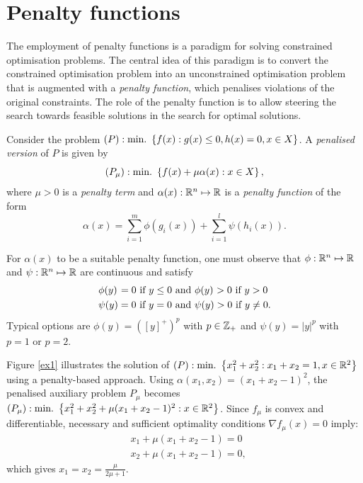 
\section{Penalty functions}

The employment of penalty functions is a paradigm for solving constrained optimisation problems. The central idea of this paradigm is to convert the constrained optimisation problem into an unconstrained optimisation problem that is augmented with a \emph{penalty function}, which penalises violations of the original constraints. The role of the penalty function is to allow steering the search towards feasible solutions in the search for optimal solutions. 

Consider the problem $(P): \mathop{\text{min.~}}\left\{ f(x) : g(x) \leq 0, h(x) = 0, x \in X \right \}$. A \emph{penalised version} of $P$ is given by 
$$
(P_\mu) : \mathop{\text{min.~}}\left\{ f(x) + \mu\alpha(x) : x \in X \right \},
$$
where $\mu > 0$ is a \emph{penalty term} and $\alpha(x) : \mathbb{R}^n \mapsto \mathbb{R}$ is a \emph{penalty function} of the form
%
\begin{equation} 
	\alpha(x) = \sum_{i=1}^m \phi(g_i(x)) + \sum_{i=1}^l\psi(h_i(x)). \label{eq:penalty_function}	
\end{equation}

For $\alpha(x)$ to be a suitable penalty function, one must observe that $\phi : \mathbb{R}^n \mapsto \mathbb{R}$ and $\psi: \mathbb{R}^n \mapsto \mathbb{R}$ are continuous and satisfy
%
\begin{align*}
	& \phi(y) \hspace{1.0pt}= 0 \text{ if } y \leq 0 \text{ and } \phi(y) \hspace{0.5pt}> 0 \text{ if } y > 0\\
	& \psi(y) = 0 \text{ if } y = 0 \text{ and } \psi(y) > 0 \text{ if } y \neq 0.
\end{align*}
%
Typical options are $\phi(y) = ([y]^+)^p$ with $p \in \mathbb{Z}_+$ and $\psi(y) = |y|^p$ with $p=1$ or $p=2$.

Figure \ref{ex1} illustrates the solution of $(P) : \mathop{\text{min.~}}\left\{ x_1^2 + x_2^2 : x_1 + x_2 = 1, x \in \mathbb{R}^2 \right \}$ using a penalty-based approach. Using $\alpha(x_1,x_2) = (x_1 + x_2 - 1)^2$, the penalised auxiliary problem $P_\mu$ becomes $(P_\mu) :\mathop{\text{min.~}}\left\{ x_1^2 + x_2^2 + \mu(x_1 + x_2 - 1)^2 : x \in \mathbb{R}^2 \right \}$. Since $f_{\mu}$ is convex and differentiable, necessary and sufficient optimality conditions $\nabla f_\mu(x) = 0$ imply:
%
\begin{align*}
& x_1 + \mu(x_1 + x_2 -1) = 0\\
& x_2 + \mu(x_1 + x_2- 1) = 0,
\end{align*}
which gives $x_1 = x_2 = \frac{\mu}{2\mu + 1}$. 

